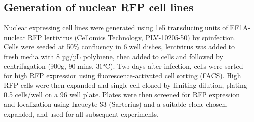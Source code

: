 \documentclass[9pt,lineno]{elife}
\begin{document}
\subsection{Generation of nuclear RFP cell lines}
Nuclear expressing cell lines were generated using 1e5 transducing units of EF1A-nuclear RFP lentivirus (Cellomics Technology, PLV-10205-50) by spinfection.
Cells were seeded at 50\% confluency in 6 well dishes, lentivirus was added to fresh media with 8 µg/µL polybrene, then added to cells and followed by centrifugation (900g, 90 mins, 30°C).
Two days after infection, cells were sorted for high RFP expression using fluorescence-activated cell sorting (FACS).
High RFP cells were then expanded and single-cell cloned by limiting dilution, plating 0.5 cells/well on a 96 well plate.
Plates were then screened for RFP expression and localization using Incucyte S3 (Sartorius) and a suitable clone chosen, expanded, and used for all subsequent experiments.
\end{document}
